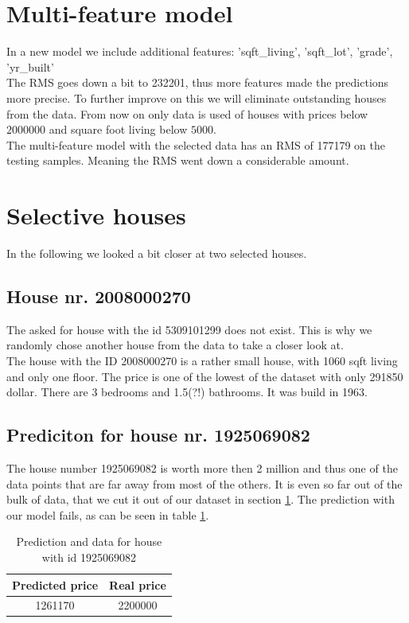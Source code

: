 \documentclass[12pt]{scrreprt}
\begin{document}
\section{Multi-feature model}
\label{sec:multi}

In a new model we include additional features: 'sqft\_living', 'sqft\_lot', 'grade', 'yr\_built'\\

The RMS goes down a bit to 232201, thus more features made the predictions more precise. To further improve on this we will eliminate outstanding houses from the data. From now on only data is used of houses with prices below $2000000$ and square foot living below $5000$.\\

The multi-feature model with the selected data has an RMS of 177179 on the testing samples. Meaning the RMS went down a considerable amount.\\

\section{Selective houses}
In the following we looked a bit closer at two selected houses.\\

\subsection{House nr. 2008000270}
The asked for house with the id 5309101299 does not exist. This is why we randomly chose another house from the data to take a closer look at.\\

The house with the ID 2008000270 is a rather small house, with 1060 sqft living and only one floor. The price is one of the lowest of the dataset with only 291850 dollar. There are 3 bedrooms and 1.5(?!) bathrooms. It was build in 1963.\\

\subsection{Prediciton for house nr. 1925069082}

The house number 1925069082 is worth more then 2 million and thus one of the data points that are far away from most of the others. It is even so far out of the bulk of data, that we cut it out of our dataset in section \ref{sec:multi}. The prediction with our model fails, as can be seen in table \ref{tab:predict_fail}.\\

\begin{table}[H]
  \caption{Prediction and data for house with id 1925069082}
  \label{tab:predict_fail}
\begin{center}
  \begin{tabular}{| c | c |}
    \hline
    \textbf{Predicted price} & \textbf{Real price}\\
    \hline
    \hline
    1261170 & 2200000 \\ \hline
  \end{tabular}
\end{center}
\end{table}
\end{document}

